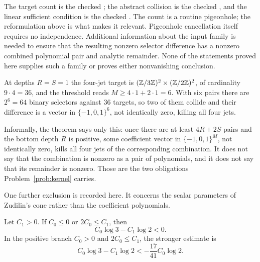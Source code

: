 \documentclass[11pt]{article}
\begin{document}
\noindent The target count is the checked
; the abstract collision is the checked
, and the linear sufficient condition is the checked
.  The count is a routine pigeonhole; the reformulation
above is what makes it relevant.  Pigeonhole cancellation itself requires no
independence.  Additional information about the input family is needed to
ensure that the resulting nonzero selector difference has a nonzero combined
polynomial pair and analytic remainder.  None of the statements proved here
supplies such a family or proves either nonvanishing conclusion.

\begin{example}\label{ex:jetcount}
At depths \(R=S=1\) the four-jet target is
\((\mathbb{Z}/3\mathbb{Z})^2\times(\mathbb{Z}/2\mathbb{Z})^2\), of cardinality \(9\cdot4=36\), and the threshold
reads \(M\ge4\cdot1+2\cdot1=6\).  With six pairs there are \(2^{6}=64\) binary
selectors against \(36\) targets, so two of them collide and their difference
is a vector in \(\{-1,0,1\}^{6}\), not identically zero, killing all four jets.
\end{example}

Informally, the theorem says only this: once there are at least \(4R+2S\) pairs
and the bottom depth \(R\) is positive, some coefficient vector in
\(\{-1,0,1\}^M\), not identically zero, kills all four jets of the
corresponding combination.  It does not say that the combination is nonzero as
a pair of polynomials, and it does not say that its remainder is nonzero.  Those
are the two obligations Problem~\ref{prob:kernel} carries.

One further exclusion is recorded here.  It concerns the scalar parameters of
Zudilin's cone rather than the coefficient polynomials.

\begin{theorem}\label{res:scalar}
Let \(C_1>0\).  If \(C_0\le0\) or \(2C_0\le C_1\), then
\[
 C_0\log 3-C_1\log 2<0.
\]
In the positive branch $C_0>0$ and $2C_0\le C_1$, the stronger estimate is
\[
 C_0\log3-C_1\log2< -\frac{17}{41}C_0\log2.
\]
\end{theorem}
\end{document}
